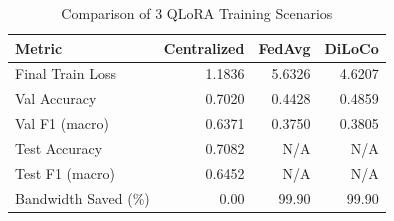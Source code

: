 \documentclass{article}
\begin{document}

\begin{table}[h]
\centering
\caption{Comparison of 3 QLoRA Training Scenarios}
\label{tab:3way_comparison}
\begin{tabular}{lrrr}
\toprule
Metric & Centralized & FedAvg & DiLoCo \\
\midrule
Final Train Loss & 1.1836 & 5.6326 & 4.6207 \\
Val Accuracy & 0.7020 & 0.4428 & 0.4859 \\
Val F1 (macro) & 0.6371 & 0.3750 & 0.3805 \\
Test Accuracy & 0.7082 & N/A & N/A \\
Test F1 (macro) & 0.6452 & N/A & N/A \\
Bandwidth Saved (\%) & 0.00 & 99.90 & 99.90 \\
\bottomrule
\end{tabular}
\end{table}

\end{document}

